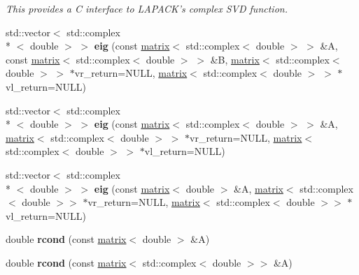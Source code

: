 \begin{DoxyCompactItemize}
\begin{DoxyCompactList}\small\item\em This provides a C interface to L\-A\-P\-A\-C\-K's complex S\-V\-D function. \end{DoxyCompactList}\item 
\hypertarget{namespacekeycpp_a61795f58aa135cfa0ebb4325f52f9de6}{std\-::vector$<$ std\-::complex\\*
$<$ double $>$ $>$ {\bfseries eig} (const \hyperlink{classkeycpp_1_1matrix}{matrix}$<$ std\-::complex$<$ double $>$ $>$ \&A, const \hyperlink{classkeycpp_1_1matrix}{matrix}$<$ std\-::complex$<$ double $>$ $>$ \&B, \hyperlink{classkeycpp_1_1matrix}{matrix}$<$ std\-::complex$<$ double $>$ $>$ $\ast$vr\-\_\-return=N\-U\-L\-L, \hyperlink{classkeycpp_1_1matrix}{matrix}$<$ std\-::complex$<$ double $>$ $>$ $\ast$vl\-\_\-return=N\-U\-L\-L)}\label{namespacekeycpp_a61795f58aa135cfa0ebb4325f52f9de6}

\item 
\hypertarget{namespacekeycpp_a4262bb0ca13c9c1e11732b9b1dab65c6}{std\-::vector$<$ std\-::complex\\*
$<$ double $>$ $>$ {\bfseries eig} (const \hyperlink{classkeycpp_1_1matrix}{matrix}$<$ std\-::complex$<$ double $>$ $>$ \&A, \hyperlink{classkeycpp_1_1matrix}{matrix}$<$ std\-::complex$<$ double $>$ $>$ $\ast$vr\-\_\-return=N\-U\-L\-L, \hyperlink{classkeycpp_1_1matrix}{matrix}$<$ std\-::complex$<$ double $>$ $>$ $\ast$vl\-\_\-return=N\-U\-L\-L)}\label{namespacekeycpp_a4262bb0ca13c9c1e11732b9b1dab65c6}

\item 
\hypertarget{namespacekeycpp_a9e462b40dbbb92e5ebef12956d76e1f8}{std\-::vector$<$ std\-::complex\\*
$<$ double $>$ $>$ {\bfseries eig} (const \hyperlink{classkeycpp_1_1matrix}{matrix}$<$ double $>$ \&A, \hyperlink{classkeycpp_1_1matrix}{matrix}$<$ std\-::complex$<$ double $>$$>$ $\ast$vr\-\_\-return=N\-U\-L\-L, \hyperlink{classkeycpp_1_1matrix}{matrix}$<$ std\-::complex$<$ double $>$$>$ $\ast$vl\-\_\-return=N\-U\-L\-L)}\label{namespacekeycpp_a9e462b40dbbb92e5ebef12956d76e1f8}

\item 
\hypertarget{namespacekeycpp_a3905cfc35dbd146f5dbf7bcb5729c2c2}{double {\bfseries rcond} (const \hyperlink{classkeycpp_1_1matrix}{matrix}$<$ double $>$ \&A)}\label{namespacekeycpp_a3905cfc35dbd146f5dbf7bcb5729c2c2}

\item 
\hypertarget{namespacekeycpp_a4d9a9dd04453e5a417f7a9eb8ae4391b}{double {\bfseries rcond} (const \hyperlink{classkeycpp_1_1matrix}{matrix}$<$ std\-::complex$<$ double $>$$>$ \&A)}\label{namespacekeycpp_a4d9a9dd04453e5a417f7a9eb8ae4391b}


\end{DoxyCompactItemize}
